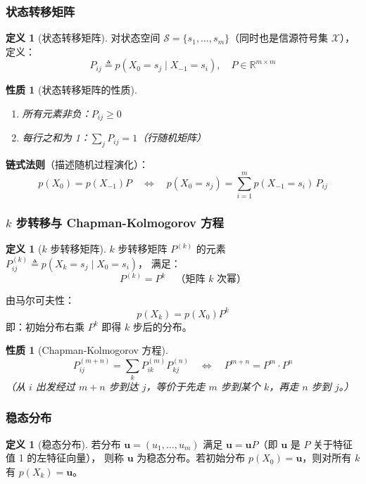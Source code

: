 \documentclass[12pt,a4paper]{ctexart}
\newtheorem{property}[theorem]{性质}
\theoremstyle{definition}
\newtheorem{definition}[theorem]{定义}
\newcommand{\XX}{\mathcal{X}}
\begin{document}
\subsubsection{状态转移矩阵}

\begin{definition}[状态转移矩阵]
对状态空间 $\mathcal{S} = \{s_1,\ldots,s_m\}$（同时也是信源符号集 $\XX$），定义：
\[
P_{ij} \triangleq p(X_0 = s_j \mid X_{-1} = s_i), \quad P \in \mathbb{R}^{m \times m}
\]
\end{definition}

\begin{property}[状态转移矩阵的性质]
\begin{enumerate}[label=(\arabic*),nosep]
  \item 所有元素非负：$P_{ij} \geq 0$
  \item 每行之和为 1：$\sum_j P_{ij} = 1$（行随机矩阵）
\end{enumerate}
\end{property}

\textbf{链式法则}（描述随机过程演化）：
\[
p(X_0) = p(X_{-1}) P
\quad\Longleftrightarrow\quad
p(X_0 = s_j) = \sum_{i=1}^{m} p(X_{-1}=s_i) \, P_{ij}
\]

\subsubsection{$k$ 步转移与 Chapman-Kolmogorov 方程}

\begin{definition}[$k$ 步转移矩阵]
$k$ 步转移矩阵 $P^{(k)}$ 的元素 $P^{(k)}_{ij} \triangleq p(X_k = s_j \mid X_0 = s_i)$，
满足：
\[
P^{(k)} = P^k \quad\text{（矩阵 $k$ 次幂）}
\]
\end{definition}

由马尔可夫性：
\[
p(X_k) = p(X_0) P^k
\]
即：初始分布右乘 $P^k$ 即得 $k$ 步后的分布。

\begin{property}[Chapman-Kolmogorov 方程]
\[
P^{(m+n)}_{ij} = \sum_{k} P^{(m)}_{ik} P^{(n)}_{kj}
\quad\Longleftrightarrow\quad
P^{m+n} = P^m \cdot P^n
\]
（从 $i$ 出发经过 $m+n$ 步到达 $j$，等价于先走 $m$ 步到某个 $k$，再走 $n$ 步到 $j$。）
\end{property}

\subsubsection{稳态分布}

\begin{definition}[稳态分布]
若分布 $\mathbf{u} = (u_1,\ldots,u_m)$ 满足 $\mathbf{u} = \mathbf{u} P$（即 $\mathbf{u}$ 是 $P$ 关于特征值 1 的左特征向量），
则称 $\mathbf{u}$ 为稳态分布。若初始分布 $p(X_0) = \mathbf{u}$，则对所有 $k$ 有 $p(X_k) = \mathbf{u}$。
\end{definition}
\end{document}
